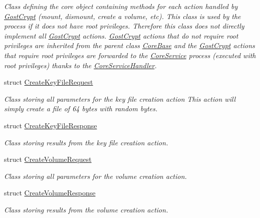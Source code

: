 \begin{DoxyCompactItemize}
\begin{DoxyCompactList}\small\item\em Class defining the core object containing methods for each action handled by \hyperlink{namespace_gost_crypt}{Gost\+Crypt} (mount, dismount, create a volume, etc). This class is used by the process if it does not have root privileges. Therefore this class does not directly implement all \hyperlink{namespace_gost_crypt}{Gost\+Crypt} actions. \hyperlink{namespace_gost_crypt}{Gost\+Crypt} actions that do not require root privileges are inherited from the parent class \hyperlink{class_gost_crypt_1_1_core_1_1_core_base}{Core\+Base} and the \hyperlink{namespace_gost_crypt}{Gost\+Crypt} actions that require root privileges are forwarded to the \hyperlink{class_gost_crypt_1_1_core_1_1_core_service}{Core\+Service} process (executed with root privileges) thanks to the \hyperlink{class_gost_crypt_1_1_core_1_1_core_service_handler}{Core\+Service\+Handler}. \end{DoxyCompactList}\item 
struct \hyperlink{struct_gost_crypt_1_1_core_1_1_create_key_file_request}{Create\+Key\+File\+Request}
\begin{DoxyCompactList}\small\item\em Class storing all parameters for the key file creation action This action will simply create a file of 64 bytes with random bytes. \end{DoxyCompactList}\item 
struct \hyperlink{struct_gost_crypt_1_1_core_1_1_create_key_file_response}{Create\+Key\+File\+Response}
\begin{DoxyCompactList}\small\item\em Class storing results from the key file creation action. \end{DoxyCompactList}\item 
struct \hyperlink{struct_gost_crypt_1_1_core_1_1_create_volume_request}{Create\+Volume\+Request}
\begin{DoxyCompactList}\small\item\em Class storing all parameters for the volume creation action. \end{DoxyCompactList}\item 
struct \hyperlink{struct_gost_crypt_1_1_core_1_1_create_volume_response}{Create\+Volume\+Response}
\begin{DoxyCompactList}\small\item\em Class storing results from the volume creation action. \end{DoxyCompactList}\item 

\end{DoxyCompactItemize}
